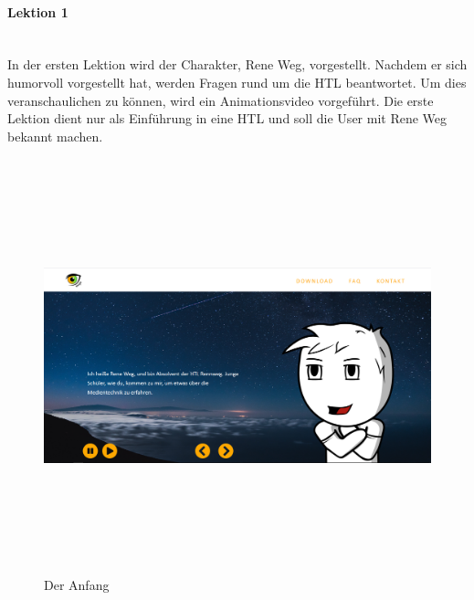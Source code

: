 \paragraph{Lektion 1}\leavevmode \\
In der ersten Lektion wird der Charakter, Rene Weg, vorgestellt. Nachdem er sich humorvoll vorgestellt hat, werden Fragen rund um die HTL beantwortet. Um dies veranschaulichen zu können, wird ein Animationsvideo vorgeführt. Die erste Lektion dient nur als Einführung in eine HTL und soll die User mit Rene Weg bekannt machen. 
\begin{figure} [h]
	\centering
\includegraphics[width=12cm,height=12cm,keepaspectratio]{webseite_abb12} 
	\caption{Der Anfang}
\end{figure}
